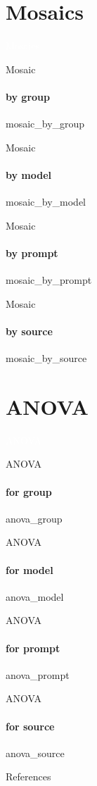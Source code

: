 \section{Mosaics}

{\nologo
{}
\begin{frame}[c,plain]{}
    \vspace*{1cm}
    \centering
    \Huge
    \textcolor{white}{Mosaics}
\end{frame}
}

{\nologo
\begin{frame}{Mosaic}
    \framesubtitle{by group}
    {mosaic_by_group}
\end{frame}
}

{\nologo
\begin{frame}{Mosaic}
    \framesubtitle{by model}
    {mosaic_by_model}
\end{frame}
}

{\nologo
\begin{frame}{Mosaic}
    \framesubtitle{by prompt}
    {mosaic_by_prompt}
\end{frame}
}

{\nologo
\begin{frame}{Mosaic}
    \framesubtitle{by source}
    {mosaic_by_source}
\end{frame}
}

\section{ANOVA}

{\nologo
{}
\begin{frame}[c,plain]{}
    \vspace*{1cm}
    \centering
    \Huge
    \textcolor{white}{ANOVA}
\end{frame}
}

{\nologo
\begin{frame}{ANOVA}
    \framesubtitle{for group}
    {anova_group}
\end{frame}
}

{\nologo
\begin{frame}{ANOVA}
    \framesubtitle{for model}
    {anova_model}
\end{frame}
}

{\nologo
\begin{frame}{ANOVA}
    \framesubtitle{for prompt}
    {anova_prompt}
\end{frame}
}

{\nologo
\begin{frame}{ANOVA}
    \framesubtitle{for source}
    {anova_source}
\end{frame}
}

\appendix

{\nologo
\begin{frame}[allowframebreaks]{References}
    \printbibliography
\end{frame}
}
